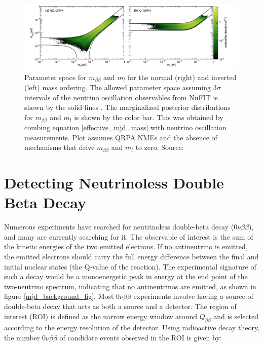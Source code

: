 \begin{figure}[!htb]
\centering
\includegraphics[trim={0.6cm 0cm 1cm 0cm},clip,width=\linewidth]
{ch1/figs/benato_posterior.png}
\caption{Parameter space for $m_{\beta\beta}$ and $m_l$ for the normal (right) and inverted (left) mass ordering. The allowed parameter space assuming $3\sigma$ intervals of the neutrino oscillation observables from NuFIT is shown by the solid lines \cite{nufit}. The marginalized posterior distributions for $m_{\beta\beta}$ and $m_l$ is shown by the color bar. This was obtained by combing equation \ref{effective_mjd_mass} with neutrino oscillation measurements. Plot assumes QRPA NMEs and the absence of mechanisms that drive $m_{\beta\beta}$ and $m_l$ to zero. Source: \cite{PhysRevD.96.053001}}
\label{majorana_mass}
\end{figure}


\section{Detecting Neutrinoless Double Beta Decay}
Numerous experiments have searched for neutrinoless double-beta decay ($0\nu\beta\beta$), and many are currently searching for it. The observable of interest is the sum of the kinetic energies of the two emitted electrons. If no antineutrino is emitted, the emitted electrons should carry the full energy difference between the final and initial nuclear states (the Q-value of the reaction). The experimental signature of such a decay would be a monoenergetic peak in energy at the end point of the two-neutrino spectrum, indicating that no antineutrinos are emitted, as shown in figure \ref{mjd_background_fig}. Most $0\nu\beta\beta$ experiments involve having a source of double-beta decay that acts as both a source and a detector. The region of interest (ROI) is defined as the narrow energy window around $Q_{\beta\beta}$ and is selected according to the energy resolution of the detector. Using radioactive decay theory, the number $0\nu\beta\beta$ of candidate events observed in the ROI is given by: %

